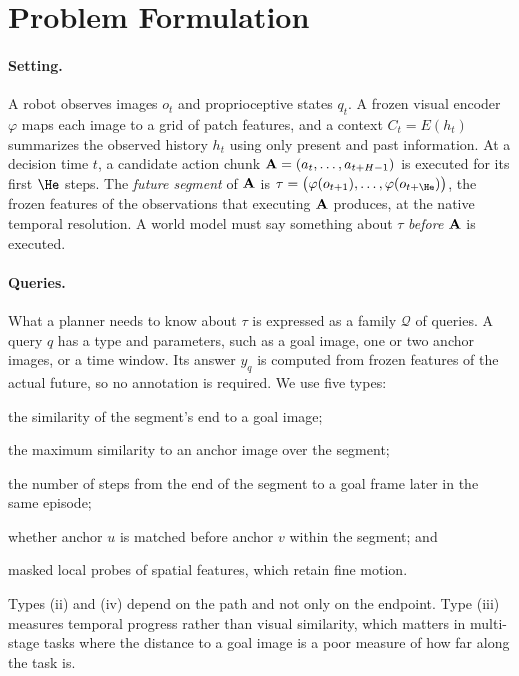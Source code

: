 \section{Problem Formulation}
\label{sec:problem}

\paragraph{Setting.}
A robot observes images $o_t$ and proprioceptive states $q_t$.
A frozen visual encoder $\varphi$ maps each image to a grid of patch features, and a context $C_t=E(h_t)$ summarizes the observed history $h_t$ using only present and past information.
At a decision time $t$, a candidate action chunk $\mathbf{A}=(a_t,\dots,a_{t+H-1})$ is executed for its first $\He$ steps.
The \emph{future segment} of $\mathbf{A}$ is $\tau=\big(\varphi(o_{t+1}),\dots,\varphi(o_{t+\He})\big)$, the frozen features of the observations that executing $\mathbf{A}$ produces, at the native temporal resolution.
A world model must say something about $\tau$ \emph{before} $\mathbf{A}$ is executed.

\paragraph{Queries.}
What a planner needs to know about $\tau$ is expressed as a family $\mathcal{Q}$ of queries.
A query $q$ has a type and parameters, such as a goal image, one or two anchor images, or a time window.
Its answer $y_q$ is computed from frozen features of the actual future, so no annotation is required.
We use five types:
\begin{enumerate*}[label=(\roman*)]
\item the similarity of the segment's end to a goal image;
\item the maximum similarity to an anchor image over the segment;
\item the number of steps from the end of the segment to a goal frame later in the same episode;
\item whether anchor $u$ is matched before anchor $v$ within the segment; and
\item masked local probes of spatial features, which retain fine motion.
\end{enumerate*}
Types (ii) and (iv) depend on the path and not only on the endpoint.
Type (iii) measures temporal progress rather than visual similarity, which matters in multi-stage tasks where the distance to a goal image is a poor measure of how far along the task is.

